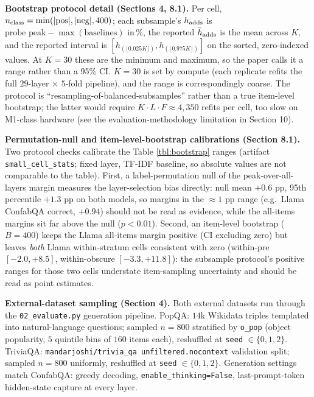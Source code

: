 \textbf{Bootstrap protocol detail (Sections 4, 8.1).} Per cell,
\(n_{\text{class}} = \min(|\rm pos|, |\rm neg|, 400)\); each subsample's
\(h_{\rm adds}\) is \(\text{probe peak} - \max(\text{baselines})\)
in\,\%, the reported \(\bar h_{\rm adds}\) is the mean across \(K\), and
the reported interval is
\([h_{(\lfloor 0.025K\rfloor)}, h_{(\lfloor 0.975K\rfloor)}]\) on the sorted, zero-indexed values.
At \(K=30\) these are the minimum and maximum, so the paper calls it a range rather than a 95\% CI. \(K=30\) is set by
compute (each replicate refits the full \(29\)-layer \(\times\)
\(5\)-fold pipeline), and the range is correspondingly coarse. The protocol is ``resampling-of-balanced-subsamples'' rather
than a true item-level bootstrap; the latter would require
\(K \cdot L \cdot F \approx 4{,}350\) refits per cell, too slow on
M1-class hardware (see the evaluation-methodology limitation in Section
10).

\textbf{Permutation-null and item-level-bootstrap calibrations (Section
8.1).} Two protocol checks calibrate the Table \ref{tbl:bootstrap} ranges
(artifact \texttt{small\_cell\_stats}; fixed layer, TF-IDF baseline, so
absolute values are not comparable to the table). First, a
label-permutation null of the peak-over-all-layers margin measures the
layer-selection bias directly: null mean \(+0.6\) pp, 95th percentile
\(+1.3\) pp on both models, so margins in the \(\approx 1\) pp range
(e.g.\ Llama ConfabQA correct, \(+0.94\)) should not be read as
evidence, while the all-items margins sit far above the null
(\(p < 0.01\)). Second, an item-level bootstrap (\(B = 400\)) keeps the
Llama all-items margin positive (CI excluding zero) but leaves
\emph{both} Llama within-stratum cells consistent with zero (within-pre
\([-2.0, +8.5]\), within-obscure \([-3.3, +11.8]\)): the subsample
protocol's positive ranges for those two cells understate item-sampling
uncertainty and should be read as point estimates.

\textbf{External-dataset sampling (Section 4).} Both external datasets
run through the \texttt{02\_evaluate.py} generation pipeline. PopQA:
\(14\)k Wikidata
triples templated into natural-language questions; sampled \(n=800\)
stratified by \texttt{o\_pop} (object popularity, \(5\) quintile bins of
\(160\) items each), reshuffled at \texttt{seed} \(\in \{0, 1, 2\}\).
TriviaQA: \texttt{mandarjoshi/trivia\_qa\ unfiltered.nocontext}
validation split; sampled \(n=800\) uniformly, reshuffled at
\texttt{seed} \(\in \{0, 1, 2\}\). Generation settings match ConfabQA:
greedy decoding, \texttt{enable\_thinking=False}, last-prompt-token
hidden-state capture at every layer.

